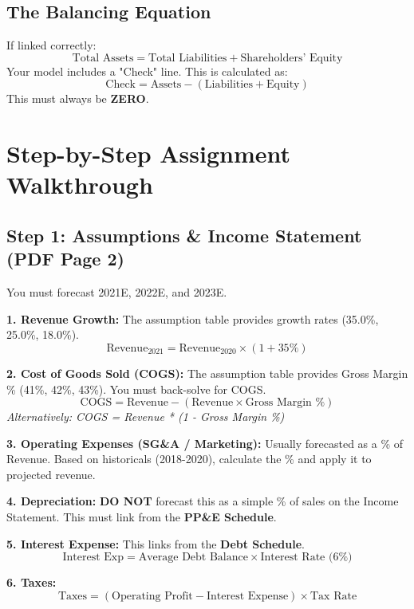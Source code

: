 \documentclass[11pt, letterpaper]{article}
\begin{document}
\subsection{The Balancing Equation}
If linked correctly:
\[ \text{Total Assets} = \text{Total Liabilities} + \text{Shareholders' Equity} \]
Your model includes a "Check" line. This is calculated as:
\[ \text{Check} = \text{Assets} - (\text{Liabilities} + \text{Equity}) \]
This must always be \textbf{ZERO}.

\newpage

\section{Step-by-Step Assignment Walkthrough}

\subsection{Step 1: Assumptions \& Income Statement (PDF Page 2)}
You must forecast 2021E, 2022E, and 2023E.

\textbf{1. Revenue Growth:}
The assumption table provides growth rates (35.0\%, 25.0\%, 18.0\%).
\begin{equation}
    \text{Revenue}_{2021} = \text{Revenue}_{2020} \times (1 + 35\%)
\end{equation}

\textbf{2. Cost of Goods Sold (COGS):}
The assumption table provides Gross Margin \% (41\%, 42\%, 43\%). You must back-solve for COGS.
\begin{equation}
    \text{COGS} = \text{Revenue} - (\text{Revenue} \times \text{Gross Margin \%})
\end{equation}
\textit{Alternatively: COGS = Revenue * (1 - Gross Margin \%)}

\textbf{3. Operating Expenses (SG\&A / Marketing):}
Usually forecasted as a \% of Revenue. Based on historicals (2018-2020), calculate the \% and apply it to projected revenue.

\textbf{4. Depreciation:}
\textbf{DO NOT} forecast this as a simple \% of sales on the Income Statement. This must link from the \textbf{PP\&E Schedule}.

\textbf{5. Interest Expense:}
This links from the \textbf{Debt Schedule}.
\begin{equation}
    \text{Interest Exp} = \text{Average Debt Balance} \times \text{Interest Rate (6\%)}
\end{equation}

\textbf{6. Taxes:}
\begin{equation}
    \text{Taxes} = (\text{Operating Profit} - \text{Interest Expense}) \times \text{Tax Rate}
\end{equation}
\end{document}
